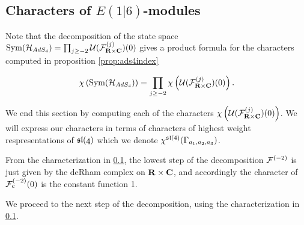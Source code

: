\documentclass[../main.tex]{subfiles}
\begin{document}
\subsection{Characters of $E(1|6)$-modules}

Note that the decomposition of the state space $\text{Sym} (\mathcal{H}_{AdS_4} ) = \prod_{j\geq -2} \mathcal{U} (\mathcal{F}^{(j)} _{\mathbf{R}\times \mathbf{C}} )(0)$ gives a product formula for the characters computed in proposition \ref{prop:ads4index}



\[\chi \left (\text{Sym} (\mathcal{H}_{AdS_4} ) \right )= \prod_{j\geq -2} \chi \left ( \mathcal{U} (\mathcal{F}^{(j)} _{\mathbf{R}\times \mathbf{C}} )(0)\right ).\]

We end this section by computing each of the characters $\chi \left ( \mathcal{U} (\mathcal{F}^{(j)} _{\mathbf{R}\times \mathbf{C}} )(0)\right )$. We will express our characters in terms of characters of highest weight respresentations of $\mathfrak{sl(4)}$ which we denote $\chi^{\mathfrak{sl}(4)}(\Gamma_{a_1,a_2, a_3} )$.

\parsec[]
From the characterization in \ref{}, the lowest step of the decomposition $\mathcal{F}^{(-2)}$ is just given by the deRham complex on $\mathbf{R}\times \mathbf{C}$, and accordingly the character of $\mathcal{F}^{(-2)}_{c}(0)$ is the constant function 1.

\parsec[]
We proceed to the next step of the decomposition, using the characterization in \ref{}.
\end{document}
